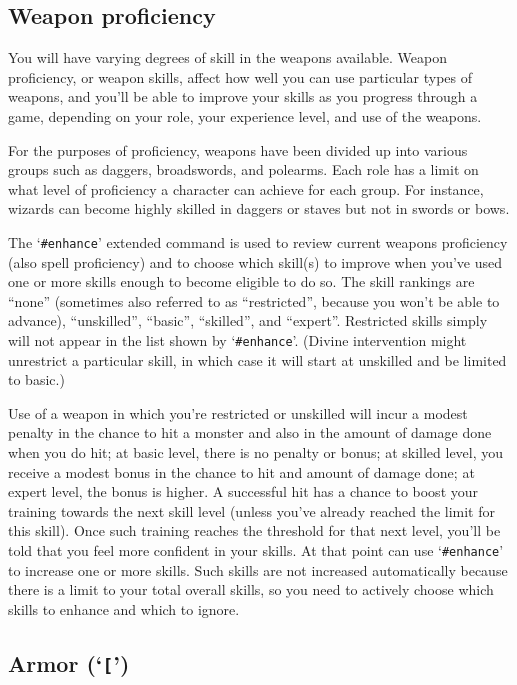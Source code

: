 \subsection*{Weapon proficiency}

You will have varying degrees of skill in the weapons available.
Weapon proficiency, or weapon skills, affect how well you can use
particular types of weapons, and you'll be able to improve your skills
as you progress through a game, depending on your role, your experience
level, and use of the weapons.

For the purposes of proficiency, weapons have
been divided up into various groups such as daggers, broadswords, and
polearms.  Each role has a limit on what level of proficiency a character
can achieve for each group.  For instance, wizards can become highly
skilled in daggers or staves but not in swords or bows.

The `{\tt \#enhance}' extended command is used to review current weapons proficiency
(also spell proficiency) and to choose which skill(s) to improve when
you've used one or more skills enough to become eligible to do so.  The
skill rankings are ``none'' (sometimes also referred to as ``restricted'',
because you won't be able to advance), ``unskilled'', ``basic'', ``skilled'',
and ``expert''.  Restricted skills simply will not appear in the list
shown by `{\tt \#enhance}'.  (Divine intervention might unrestrict a particular
skill, in which case it will start at unskilled and be limited to basic.)

Use of a weapon in which you're restricted or unskilled
will incur a modest penalty in the chance to hit a monster and also in
the amount of damage done when you do hit; at basic level, there is no
penalty or bonus; at skilled level, you receive a modest bonus in the
chance to hit and amount of damage done; at expert level, the bonus is
higher.  A successful hit has a chance to boost your training towards
the next skill level (unless you've already reached the limit for this
skill).  Once such training reaches the threshold for that next level,
you'll be told that you feel more confident in your skills.  At that
point can use `{\tt \#enhance}' to increase one or more skills.  Such skills
are not increased automatically because there is a limit to your total
overall skills, so you need to actively choose which skills to enhance
and which to ignore.

\subsection*{Armor (`{\tt [}')}

